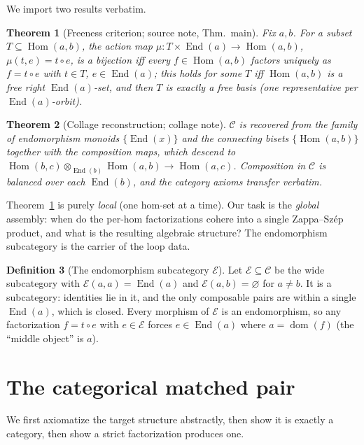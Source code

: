 \documentclass[11pt]{article}
\newtheorem{theorem}{Theorem}
\theoremstyle{definition}
\newtheorem{definition}[theorem]{Definition}
\newcommand{\Hom}{\operatorname{Hom}}
\newcommand{\End}{\operatorname{End}}
\newcommand{\C}{\mathcal{C}}
\newcommand{\E}{\mathcal{E}}
\begin{document}
We import two results verbatim.

\begin{theorem}[Freeness criterion; source note, Thm.~main]\label{thm:free}
Fix $a,b$. For a subset $T\subseteq\Hom(a,b)$, the action map
$\mu:T\times\End(a)\to\Hom(a,b)$, $\mu(t,e)=t\circ e$, is a bijection iff every
$f\in\Hom(a,b)$ factors \emph{uniquely} as $f=t\circ e$ with $t\in T$,
$e\in\End(a)$; this holds for some $T$ iff $\Hom(a,b)$ is a free right
$\End(a)$-set, and then $T$ is exactly a free basis (one representative per
$\End(a)$-orbit).
\end{theorem}

\begin{theorem}[Collage reconstruction; collage note]\label{thm:collage}
$\C$ is recovered from the family of endomorphism monoids $\{\End(x)\}$ and the
connecting bisets $\{\Hom(a,b)\}$ together with the composition maps, which
descend to $\Hom(b,c)\otimes_{\End(b)}\Hom(a,b)\to\Hom(a,c)$. Composition in
$\C$ is balanced over each $\End(b)$, and the category axioms transfer verbatim.
\end{theorem}

Theorem~\ref{thm:free} is purely \emph{local} (one hom-set at a time). Our task
is the \emph{global} assembly: when do the per-hom factorizations cohere into a
single Zappa--Sz\'ep product, and what is the resulting algebraic structure? The
endomorphism subcategory is the carrier of the loop data.

\begin{definition}[The endomorphism subcategory $\E$]
Let $\E\subseteq\C$ be the wide subcategory with $\E(a,a)=\End(a)$ and
$\E(a,b)=\varnothing$ for $a\neq b$. It is a subcategory: identities lie in it,
and the only composable pairs are within a single $\End(a)$, which is closed.
Every morphism of $\E$ is an endomorphism, so any factorization $f=t\circ e$ with
$e\in\E$ forces $e\in\End(a)$ where $a=\operatorname{dom}(f)$ (the ``middle
object'' is $a$).
\end{definition}

\section{The categorical matched pair}

We first axiomatize the target structure abstractly, then show it is exactly a
category, then show a strict factorization produces one.
\end{document}
